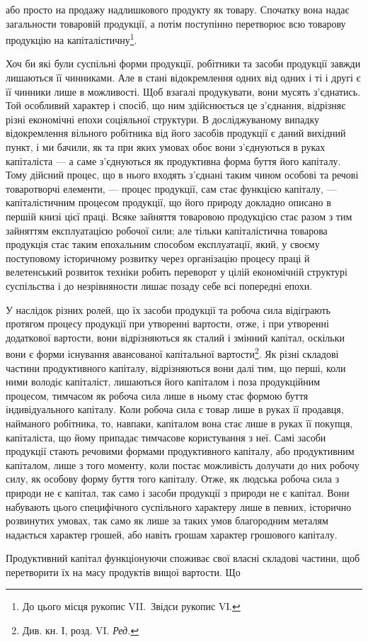 \parcont{}  %
або просто на продажу надлишкового продукту як товару. Спочатку
вона надає загальности товаровій продукції, а потім поступінно перетворює
всю товарову продукцію на капіталістичну\footnote{
До цього місця рукопис VII.~Звідси рукопис VІ.
}.

\label{original-13}
Хоч би які були суспільні форми продукції, робітники та засоби продукції
завжди лишаються її чинниками. Але в стані відокремлення одних
від одних і ті і другі є її чинники лише в можливості. Щоб взагалі
продукувати, вони мусять з’єднатись. Той особливий характер і спосіб,
що ним здійснюється це з’єднання, відрізняє різні економічні епохи соціяльної
структури. В досліджуваному випадку відокремлення вільного
робітника від його засобів продукції є даний вихідний пункт, і ми
бачили, як та при яких умовах обоє вони з’єднуються в руках капіталіста —
а саме з’єднуються як продуктивна форма буття його капіталу. Тому
дійсний процес, що в нього входять з’єднані таким чином особові та
речові товаротворчі елементи, — процес продукції, сам стає функцією капіталу,
— капіталістичним процесом продукції, що його природу докладно
описано в першій книзі цієї праці. Всяке зайняття товаровою продукцією
стає разом з тим зайняттям експлуатацією робочої сили; але тільки капіталістична
товарова продукція стає таким епохальним способом експлуатації,
який, у своєму поступовому історичному розвитку через організацію
процесу праці й велетенський розвиток техніки робить переворот
у цілій економічній структурі суспільства і до незрівняности лишає позаду
себе всі попередні епохи.

У наслідок різних ролей, що їх засоби продукції та робоча сила відіграють
протягом процесу продукції при утворенні вартости, отже, і
при утворенні додаткової вартости, вони відрізняються як сталий і
змінний капітал, оскільки вони є форми існування авансованої капітальної
вартости\footnote*{
Див. кн. І, розд. VI. \emph{Ред.}
}. Як різні складові частини продуктивного капіталу, відрізняються
вони далі тим, що перші, коли ними володіє капіталіст, лишаються
його капіталом і поза продукційним процесом, тимчасом як робоча сила
лише в ньому стає формою буття індивідуального капіталу. Коли робоча
сила є товар лише в руках її продавця, найманого робітника, то, навпаки,
капіталом вона стає лише в руках її покупця, капіталіста, що
йому припадає тимчасове користування з неї. Самі засоби продукції
стають речовими формами продуктивного капіталу, або продуктивним
капіталом, лише з того моменту, коли постає можливість долучати до
них робочу силу, як особову форму буття того капіталу. Отже,
як людська робоча сила з природи не є капітал, так само і засоби
продукції з природи не є капітал. Вони набувають цього специфічного
суспільного характеру лише в певних, історично розвинутих умовах,
так само як лише за таких умов благородним металям надається характер
грошей, або навіть грошам характер грошового капіталу.

Продуктивний капітал функціонуючи споживає свої власні складові
частини, щоб перетворити їх на масу продуктів вищої вартости. Що
\parbreak{}  %
